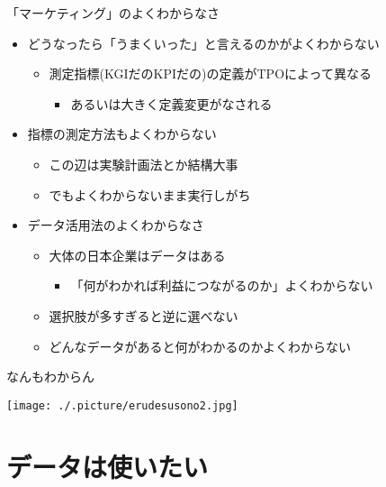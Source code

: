 \documentclass[ignorenonframetext,]{beamer}
\providecommand{\tightlist}{%
  \setlength{\itemsep}{0pt}\setlength{\parskip}{0pt}}
\begin{document}
\begin{frame}{「マーケティング」のよくわからなさ}

\begin{itemize}
\tightlist
\item
  どうなったら「うまくいった」と言えるのかがよくわからない

  \begin{itemize}
  \tightlist
  \item
    測定指標(KGIだのKPIだの)の定義がTPOによって異なる

    \begin{itemize}
    \tightlist
    \item
      あるいは大きく定義変更がなされる
    \end{itemize}
  \end{itemize}
\item
  指標の測定方法もよくわからない

  \begin{itemize}
  \tightlist
  \item
    この辺は実験計画法とか結構大事
  \item
    でもよくわからないまま実行しがち
  \end{itemize}
\item
  データ活用法のよくわからなさ

  \begin{itemize}
  \tightlist
  \item
    大体の日本企業はデータはある

    \begin{itemize}
    \tightlist
    \item
      「何がわかれば利益につながるのか」よくわからない
    \end{itemize}
  \item
    選択肢が多すぎると逆に選べない
  \item
    どんなデータがあると何がわかるのかよくわからない
  \end{itemize}
\end{itemize}

\end{frame}

\begin{frame}{}
\protect\hypertarget{section}{}

なんもわからん

\texttt{[image: ./.picture/erudesusono2.jpg]}

\end{frame}

\section{データは使いたい}
\end{document}

